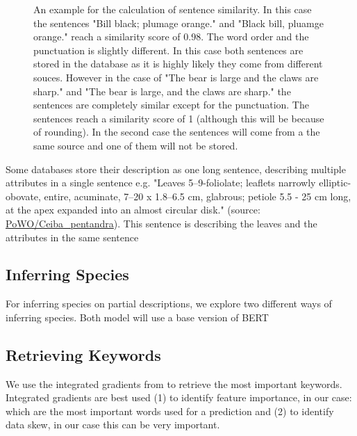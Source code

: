 \documentclass[a4paper, 12pt, oneside]{book} %
\begin{document}
\begin{figure} [htbp]
    \centering
    \vspace{0cm}
    \hspace{-1cm}
    \makebox[\textwidth][c]{}
    \caption[Example of sentence similarity]{An example for the calculation of sentence similarity. 
    In this case the sentences "Bill black; plumage orange." and "Black bill, pluamge orange." reach a similarity score of 0.98. The word order and the punctuation is slightly different. In this case both sentences are stored in the database as it is highly likely they come from different souces. However in the case of "The bear is large and the claws are sharp." and "The bear is large, and the claws are sharp." the sentences are completely similar except for the punctuation. The sentences reach a similarity score of 1 (although this will be because of rounding). In the second case the sentences will come from a the same source and one of them will not be stored.}
    \label{fig:similarity_matrix}
\end{figure}

Some databases store their description as one long sentence, describing multiple attributes in a single sentence e.g. "Leaves 5–9-foliolate; leaflets narrowly elliptic-obovate, entire, acuminate, 7–20 x 1.8–6.5 cm, glabrous; petiole 5.5 - 25 cm long, at the apex expanded into an almost circular disk." (source: \href{http://powo.science.kew.org/taxon/urn:lsid:ipni.org:names:1166232-2}{PoWO/Ceiba\_pentandra}). 
This sentence is describing the leaves and the attributes in the same sentence 

\subsection{Inferring Species}
For inferring species on partial descriptions, we explore two different ways of inferring species.
Both model will use a base version of BERT \autocite{devlin_bert_2019}
\subsection{Retrieving Keywords}
We use the integrated gradients from \textcite{sundararajan_axiomatic_2017} to retrieve the most important keywords.
Integrated gradients are best used (1) to identify feature importance, in our case: which are the most important words used for a prediction and (2) to identify data skew, in our case this can be very important. %
\end{document}
